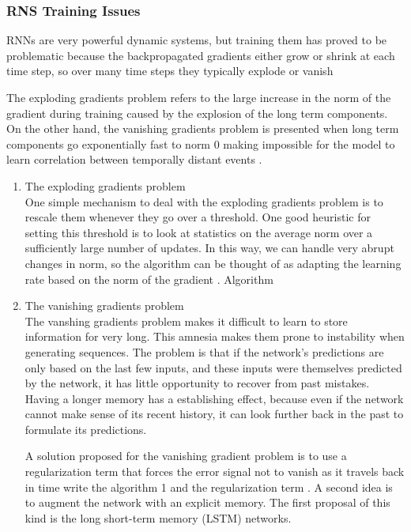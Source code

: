 \subsubsection{RNS Training Issues}
RNNs are very powerful dynamic systems, but training them has proved to be problematic because the backpropagated gradients either grow or shrink at each time step, so over many time steps they typically explode or vanish\cite{lecun2015deep}

The exploding gradients problem refers to the large increase in the norm of the gradient during training caused by the explosion of the long term components. On the other hand, the vanishing gradients problem is presented when long term components go exponentially fast to norm 0 making impossible for the model to learn correlation between temporally distant events \cite{pascanu2013difficulty}. 

\begin{enumerate}
\item The exploding gradients problem \\
 One simple mechanism to deal with the exploding gradients problem is to rescale them whenever they go over a threshold. One good heuristic for setting this threshold is to look at statistics on the average norm over a sufficiently large number of updates. In this way, we can handle very abrupt changes in norm, so the algorithm can be thought of as adapting the learning rate based on the norm of the gradient  \cite{pascanu2013difficulty}.
Algorithm
\item The vanishing gradients problem \\
The vanshing gradients problem makes it difficult to learn to store information for very long. 
This amnesia makes them prone to instability when generating sequences. The problem is that if the network's predictions  are only based on the last few inputs, and these inputs were themselves predicted by the network, it has little opportunity to recover from past mistakes. Having a longer memory has a establishing effect, because even if the network cannot make sense of its recent history, it can look further back in the past to formulate its predictions. \cite{graves2013generating}

A solution proposed for the vanishing gradient problem is to use a regularization term that forces the error signal not to vanish as it travels back in time  write the algorithm 1 and the regularization term \cite{pascanu2013difficulty}.
A second idea is to augment the network with an explicit memory. The first proposal of this kind is the long short-term memory (LSTM) networks.

\end{enumerate}
